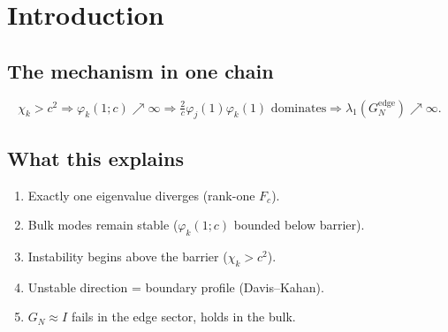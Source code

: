 
\begin{abstract}
We study the discrete sampling Gram matrix
$G_N[j,k] = c^{-1}\sum_{n=-c}^{c}
\varphi_j(n/c;c)\,\varphi_k(n/c;c)$,
where $\{\varphi_k(\,\cdot\,;c)\}$ are the $L^2([-1,1])$-normalised
prolate spheroidal wave functions with bandwidth $c$.
The classical picture $G_N \approx I$ holds in the bulk sector
but fails for above-barrier modes ($\chi_k > c^2$):
rather than producing a small perturbation of the identity,
the edge sector admits the rank-one decomposition
\[
  G_N^{\mathrm{edge}} = I + \lambda_{\mathrm{eff}}(c)\,P_{e_c} + R_c^\perp,
\]
where $e_c = (\varphi_k(1;c))_{k\in\mathcal{I}_{\mathrm{edge}}}$
is the boundary profile vector,
$\lambda_{\mathrm{eff}}(c)$ is numerically dominant and growing,
and $\|R_c^\perp\|_{\mathrm{op}}/\lambda_{\mathrm{eff}}(c) \le 0.010$.
By the Davis--Kahan theorem, the unique unstable eigenvector
converges to the boundary profile direction:
$|\langle v_1,\, e_c/\|e_c\|\rangle| \ge 0.9975$.
This is a \emph{boundary spectral decomposition} of a singularly
discretized band-limiting operator, not a quadrature error result.
\end{abstract}

\section{Introduction}\label{sec:intro}

\subsection{The mechanism in one chain}
\[
\chi_k > c^2
\Rightarrow \varphi_k(1;c)\nearrow\infty
\Rightarrow \tfrac{2}{c}\varphi_j(1)\varphi_k(1) \text{ dominates}
\Rightarrow \lambda_1(G_N^{\mathrm{edge}})\nearrow\infty.
\]

\subsection{What this explains}
\begin{enumerate}
\item Exactly one eigenvalue diverges (rank-one $F_c$).
\item Bulk modes remain stable ($\varphi_k(1;c)$ bounded below barrier).
\item Instability begins above the barrier ($\chi_k > c^2$).
\item Unstable direction = boundary profile (Davis--Kahan).
\item $G_N \approx I$ fails in the edge sector, holds in the bulk.
\end{enumerate}
